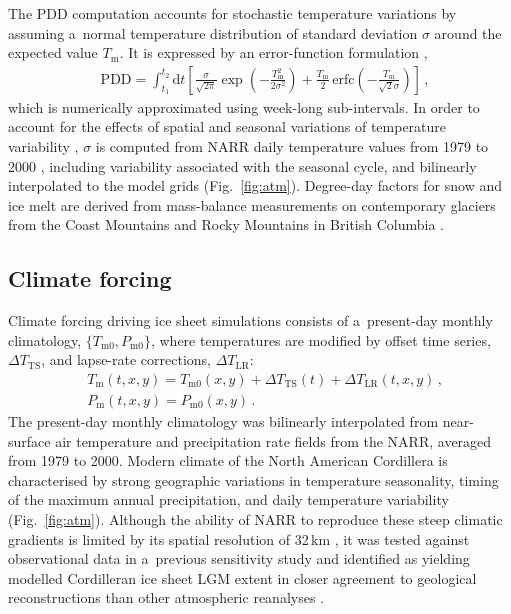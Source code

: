 \documentclass[tc, manuscript]{copernicus}
\begin{document}
      The PDD computation accounts for stochastic temperature variations by
      assuming a~normal temperature distribution of standard deviation
      $\sigma$ around the expected value $T_{\mathrm{m}}$. It is expressed
      by an error-function formulation \citep{Calov.Greve.2005},
\begin{align}
&\label{eqn:calovgreve}
    {\text{PDD}} = \int_{t_1}^{t_2} \mathrm{d}t
        \left[\frac{\sigma}{\sqrt{2\pi}}
                \exp\left({-\frac{T_{\mathrm{m}}^2}{2\sigma^2}}\right)
              + \frac{T_{\mathrm{m}}}{2} \, {\text{erfc}}
                \left(-\frac{T_{\mathrm{m}}}{\sqrt{2}\sigma}\right)\right] \,,
\end{align}
      which is numerically approximated using week-long sub-intervals. In
      order to account for the effects of spatial and seasonal variations of
      temperature variability \citep{Seguinot.2013}, $\sigma$ is computed
      from NARR daily temperature values from 1979 to 2000
      \citep{Mesinger.etal.2006}, including variability associated with the
      seasonal cycle, and bilinearly interpolated to the model grids
      (Fig.~\ref{fig:atm}). Degree-day factors for snow and
      ice melt are derived from mass-balance measurements on contemporary
      glaciers from the Coast Mountains and Rocky Mountains in British
      Columbia \citep[Table~\ref{tab:params};][]{Shea.etal.2009}.

\subsection{Climate forcing}
\label{sec:atm}%

      Climate forcing driving ice sheet simulations consists of
      a~present-day monthly climatology, $\{T_{\mathrm{m}0},
      P_{\mathrm{m}0}\}$, where temperatures are modified by offset time
      series, ${\Delta}T_{\text{TS}}$, and lapse-rate corrections,
      ${\Delta}T_{\text{LR}}$:
\begin{align}
&T_{\mathrm{m}}(t, x, y) = T_{\mathrm{m}0}(x, y) + {\Delta}T_{\text{TS}}(t)
                    + {\Delta}T_{\text{LR}}(t, x, y) \,, \\
&    P_{\mathrm{m}}(t, x, y) = P_{\mathrm{m}0}(x, y) \,.
\end{align}
      The present-day monthly climatology was bilinearly interpolated from
      near-surface air
      temperature and precipitation rate fields from the NARR, averaged from
      1979 to 2000. Modern climate of the North American Cordillera is
      characterised by strong geographic variations in temperature
      seasonality, timing of the maximum annual precipitation, and daily
      temperature variability (Fig.~\ref{fig:atm}). Although the ability
      of NARR to reproduce these steep climatic gradients is limited by its
      spatial resolution of 32\,\unit{km} \citep{Jarosch.etal.2012}, it was
      tested against observational data in a~previous sensitivity study and
      identified as yielding modelled Cordilleran ice sheet LGM extent in
      closer agreement to geological reconstructions than other atmospheric
      reanalyses \citep{Seguinot.etal.2014}.
\end{document}
